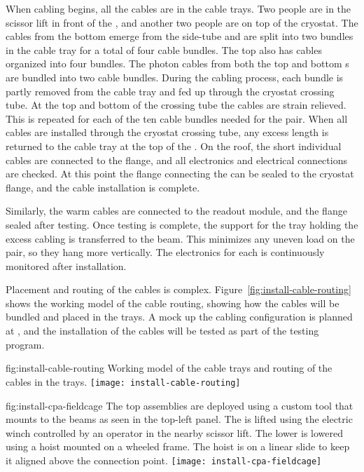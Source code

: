 When cabling begins, all the cables are in the cable trays. 
Two people are in the scissor lift in front of the , and another two people are on top of the cryostat. 
The  cables from the bottom  emerge from the  side-tube  and are split into two bundles in the cable tray for a total of four cable bundles. 
The top  also has  cables organized into four bundles. 
The photon cables from both the top and bottom s are bundled into two cable bundles.
During the cabling process, each bundle is partly removed from the cable tray and  fed up through the cryostat crossing tube. 
At the top and bottom of the crossing tube  the cables are strain relieved.
This is repeated for each of the ten cable bundles needed for the  pair. 
When all cables are installed through the cryostat crossing tube, any excess length is returned to the cable tray at the top of the . 
On the roof, the short individual cables are connected to the \fdth  flange, and all electronics and electrical connections are checked. 
At this point the flange connecting the  can be sealed to the cryostat \fdth flange, and the cable installation is complete. 

Similarly, the  warm cables are connected to the readout module, and the flange sealed after testing.  
Once testing is complete, the support for the tray holding the excess cabling is transferred to the  beam.  
This minimizes any uneven load on the  pair, so they hang more vertically.   
The electronics for each  is continuously monitored after installation. 

Placement and routing of the cables is complex. 
Figure~\ref{fig:install-cable-routing} shows the working \threed model of the cable routing, showing how the cables will be bundled and placed in the trays. 
A mock up the cabling configuration is planned at , and the installation of the cables will be tested as part of the  testing program.

\begin{dunefigure}{fig:install-cable-routing}
  {Working model of the cable trays and routing of the  cables in the trays.}
\texttt{[image: install-cable-routing]}
\end{dunefigure}


\begin{dunefigure}{fig:install-cpa-fieldcage}
  {The top  assemblies are deployed using a custom tool that mounts to the  beams as seen in the top-left panel. The   is lifted using the electric winch controlled by an operator in the nearby scissor lift. The lower   is lowered using a hoist mounted on a wheeled frame. The hoist is on a linear slide to keep it aligned above the connection point.}
\texttt{[image: install-cpa-fieldcage]}
\end{dunefigure}

